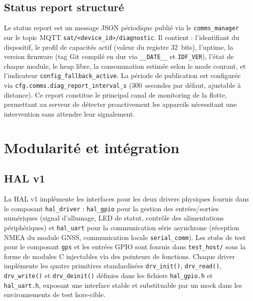 \subsection{Status report structuré}
\label{subsec:diag_report}

Le status report est un message JSON périodique publié via le
\texttt{comms\_manager} sur le topic MQTT
\texttt{sat/<device\_id>/diagnostic}. Il contient : l'identifiant
du dispositif, le profil de capacités actif (valeur du registre
32~bits), l'uptime, la version firmware (tag Git compilé en dur via
\texttt{\_\_DATE\_\_} et \texttt{IDF\_VER}), l'état de chaque module,
le heap libre, la consommation estimée selon le mode courant, et
l'indicateur \texttt{config\_fallback\_active}. La période de
publication est configurée via \texttt{cfg.comms.diag\_report\_interval\_s}
(300~secondes par défaut, ajustable à distance). Ce report constitue
le principal canal de monitoring de la flotte, permettant au serveur
de détecter proactivement les appareils nécessitant une intervention
sans attendre leur signalement.

\section{Modularité et intégration}
\label{sec:modularite}

\subsection{HAL v1}
\label{subsec:hal_v1}

La HAL v1 implémente les interfaces pour les deux drivers physiques
fournis dans le composant \texttt{hal\_driver} : \texttt{hal\_gpio}
pour la gestion des entrées/sorties numériques (signal d'allumage,
LED de statut, contrôle des alimentations périphériques) et
\texttt{hal\_uart} pour la communication série asynchrone (réception
NMEA du module GNSS, communication locale \texttt{serial\_comm}).
Les stubs de test pour le composant \texttt{gps} et les entrées GPIO
sont fournis dans \texttt{test\_host/} sous la forme de modules C
injectables via des pointeurs de fonctions. Chaque driver implémente
les quatre primitives standardisées \texttt{drv\_init()},
\texttt{drv\_read()}, \texttt{drv\_write()} et \texttt{drv\_deinit()}
définies dans les fichiers \texttt{hal\_gpio.h} et \texttt{hal\_uart.h},
exposant une interface stable et substituable par un mock dans les
environnements de test hors-cible.

